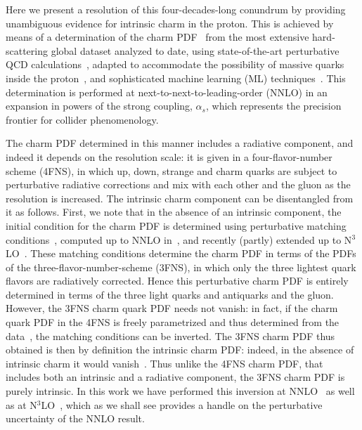 \documentclass[11pt,a4paper]{article}
\begin{document}
Here we present a resolution of this four-decades-long conundrum
by providing unambiguous evidence for intrinsic charm  in the proton.
%
This is achieved by means of a determination of the charm
PDF~\cite{Ball:2021leu} from the most extensive hard-scattering 
global dataset analyzed to date, using state-of-the-art perturbative
QCD calculations~\cite{Heinrich:2020ybq}, adapted to accommodate the possibility of massive quarks inside the proton~\cite{Forte:2010ta,Ball:2015dpa,Ball:2015tna}, and sophisticated machine 
learning (ML)
techniques~\cite{Ball:2016neh,Ball:2017nwa,Ball:2021leu}. This
determination is performed at next-to-next-to-leading-order (NNLO) in an
expansion in powers of the strong coupling, $\alpha_s$, which
represents the precision frontier for collider phenomenology.
%

The charm PDF determined in this manner includes a 
radiative component, and
indeed it depends on the resolution scale: it is 
given in a four-flavor-number scheme (4FNS), in which up, 
down, strange and charm quarks are subject to  perturbative
radiative corrections and mix with each other and the gluon as the
resolution is increased.
%
The
intrinsic charm component can be disentangled from it as follows.
%
First, we
note that in the absence of an intrinsic component, the initial
condition for the charm PDF is determined using perturbative matching
conditions~\cite{Collins:1986mp}, computed  up to NNLO in~\cite{pdfnnlo},
and recently (partly) extended up to N$^3$LO~\cite{Bierenbaum:2009zt,Bierenbaum:2009mv,Ablinger:2010ty,Ablinger:2014vwa,Ablinger:2014uka,Behring:2014eya,Ablinger_2014,Ablinger:2014nga,Blumlein:2017wxd}.
%
These matching conditions 
determine the charm PDF in terms of the PDFs of the
three-flavor-number-scheme (3FNS), in which only the three lightest quark 
flavors are radiatively corrected.
%
Hence this perturbative charm PDF is
entirely determined in terms of the three light quarks and antiquarks
and the gluon.
%
However, the 3FNS charm quark PDF needs not
vanish: in fact, if the charm quark PDF in the 4FNS is freely
parametrized and thus determined from the data~\cite{Ball:2015tna},
the matching conditions can be inverted.
%
The 3FNS charm PDF
thus obtained is then by definition the intrinsic charm PDF: indeed, in
the absence of intrinsic charm it would vanish~\cite{Ball:2015dpa}. 
Thus unlike the 4FNS charm PDF, that
includes both an intrinsic and a radiative
component, the 3FNS charm
PDF is purely intrinsic.
%
In this work we have performed this inversion at
NNLO~\cite{pdfnnlo} as well as at N$^3$LO~\cite{Bierenbaum:2009zt,Bierenbaum:2009mv,Ablinger:2010ty,Ablinger:2014vwa,Ablinger:2014uka,Behring:2014eya,Ablinger_2014,Ablinger:2014nga,Blumlein:2017wxd},
which as we shall see provides a handle on the perturbative uncertainty of the NNLO result.
\end{document}
